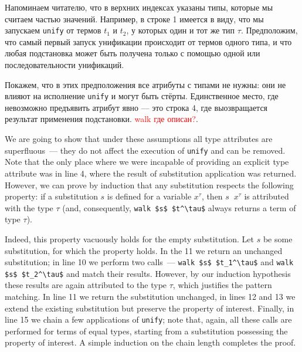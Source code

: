 Напоминаем читателю, что в верхних индексах указаны типы, которые мы считаем частью значений.
Например, в строке 1 имеется в виду, что мы запускаем \lstinline|unify|
от термов $t_1$ и $t_2$, у которых один и тот же тип $\tau$. Предположим, что самый первый запуск унификации происходит от термов одного типа, и что любая подстановка может быть получена только с помощью одной или последовательности унификаций.


Покажем, что в этих предположения все атрибуты с типами не нужны: они не влияют на исполнение  \lstinline|unify| и могут быть стёрты.
Единственное место, где невозможно предъявить атрибут явно --- это строка 4, где выозвращается результат применения подстановки.
\textcolor{red}{walk где описан?}.

We are going to show that under these assumptions all type attributes are superfluous~--- they
do not affect the execution of \lstinline|unify| and can be removed. Note that the only place where we
were incapable of providing an explicit type attribute was in line 4, where the result of
substitution application was returned.
However, we can prove by induction that any substitution respects the following property: if a substitution $s$ is defined for a variable $x^\tau$,
then $s\;\;x^\tau$ is attributed with the type $\tau$ (and, consequently, \lstinline|walk $s$ $t^\tau$| always returns a term of type $\tau$).

Indeed, this property vacuously holds for the empty substitution. Let $s$ be some substitution, for which the
property holds. In the 11 we return an unchanged substitution; in line 10 we perform two calls~---
\lstinline|walk $s$ $t_1^\tau$| and \lstinline|walk $s$ $t_2^\tau$| and match their results. However,
by our induction hypothesis these results are again attributed to the type $\tau$, which justifies the
pattern matching. In line 11 we return the substitution unchanged, in lines 12 and 13 we extend the
existing substitution but preserve the property of interest. Finally, in line 15 we chain a few
applications of \lstinline|unify|; note that, again, all these calls are performed for terms of equal
types, starting from a substitution possessing the property of interest.
A simple induction on the chain length completes the proof.

